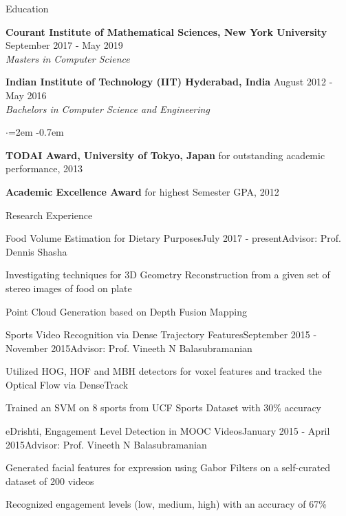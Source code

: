 \documentclass{resume}
\begin{document}
\begin{rSection}{Education}

{\bf Courant Institute of Mathematical Sciences, New York University} \hfill September 2017 - May 2019 \\
\it{Masters in Computer Science}

\vspace{-0.4em}

{\bf Indian Institute of Technology (IIT) Hyderabad, India} \hfill August 2012 - May 2016 \\
\it{Bachelors in Computer Science and Engineering}
\begin{list}{$\cdot$}{\leftmargin=2em}
\itemsep -0.7em \vspace{-0.5em}
\item {\bf TODAI Award, University of Tokyo, Japan} for outstanding academic performance, 2013
\item {\bf Academic Excellence Award} for highest Semester GPA, 2012
\end{list}

\end{rSection}

\begin{rSection}{Research Experience}

\begin{rSubsection}{Food Volume Estimation for Dietary Purposes}{July 2017 - present}{Advisor: Prof. Dennis Shasha}{}
\item Investigating techniques for 3D Geometry Reconstruction from a given set of stereo images of food on plate
\item Point Cloud Generation based on Depth Fusion Mapping

\end{rSubsection}

\begin{rSubsection}{Sports Video Recognition via Dense Trajectory Features}{September 2015 - November 2015}{Advisor:  Prof. Vineeth N Balasubramanian}{}
\item Utilized HOG, HOF and MBH detectors for voxel features and tracked the Optical Flow via DenseTrack
\item Trained an SVM on 8 sports from UCF Sports Dataset with 30\% accuracy

\end{rSubsection}

\begin{rSubsection}{eDrishti, Engagement Level Detection in MOOC Videos}{January 2015 - April 2015}{Advisor:  Prof. Vineeth N Balasubramanian}{}
\item Generated facial features for expression using Gabor Filters on a self-curated dataset of 200 videos
\item Recognized engagement levels (low, medium, high) with an accuracy of 67\%

\end{rSubsection}

\end{rSection}
\end{document}
